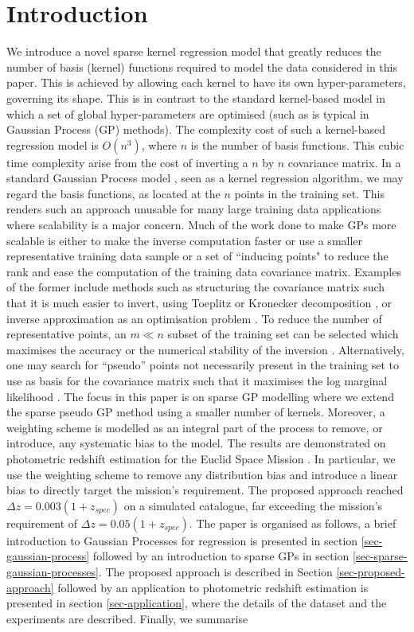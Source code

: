 \documentclass[useAMS,usenatbib,fleqn]{mn2e}
\begin{document}
\section{Introduction}
We introduce a novel sparse kernel regression model that greatly reduces the number of basis (kernel) functions required to model the data considered in this paper. This is achieved by allowing each kernel to have its own hyper-parameters, governing its shape. This is in contrast to the standard kernel-based model in which a set of global hyper-parameters are optimised (such as is typical in Gaussian Process (GP) methods). The complexity cost of such a kernel-based regression model is $O\left(n^{3}\right)$, where $n$ is the number of basis functions. This cubic time complexity arise from the cost of inverting a $n$ by $n$ covariance matrix. In a standard Gaussian Process model \citep{rasmussen2006gaussian}, seen as a kernel regression algorithm, we may regard the basis functions, as located at the $n$ points in the training set. This renders such an approach unusable for many large training data applications where scalability is a major concern. Much of the work done to make GPs more scalable is either to make the inverse computation faster or use a smaller representative training data sample or a set of ``inducing points" to reduce the rank and ease the computation of the training data covariance matrix. Examples of the former include methods such as structuring the covariance matrix such that it is much easier to invert, using Toeplitz  \citep{zhang2005time} or Kronecker decomposition \citep{tsiligkaridis2013}, or inverse approximation as an optimisation problem \citep{gibbs97}. To reduce the number of representative points, an $m \ll n$ subset of the training set can be selected which maximises the accuracy or the numerical stability of the inversion \citep{foster2009}. Alternatively, one may search for ``pseudo'' points not necessarily present in the training set to use as basis for the covariance matrix such that it maximises the log marginal likelihood \citep{snelson2005}. The focus in this paper is on sparse GP modelling where we extend the sparse pseudo GP method using a smaller number of kernels. Moreover, a weighting scheme is modelled as an integral part of the process to remove, or introduce, any systematic bias to the model. The results are demonstrated on photometric redshift estimation for the Euclid Space Mission \citep{laureijs2011}. In particular, we use the weighting scheme to remove any distribution bias and introduce a linear bias to directly target the mission's requirement. The proposed approach reached $\Delta z = 0.003(1+z_{spec})$ on a simulated catalogue, far exceeding the mission's requirement of $\Delta z = 0.05(1+z_{spec})$. The paper is organised as follows, a brief introduction to Gaussian Processes for regression is presented in section \ref{sec-gaussian-process} followed by an introduction to sparse GPs in section \ref{sec-sparse-gaussian-processes}. The proposed approach is described in Section \ref{sec-proposed-approach} followed by an application to photometric redshift estimation is presented in section \ref{sec-application}, where the details of the dataset and the experiments are described. Finally, we summarise 
\end{document}
